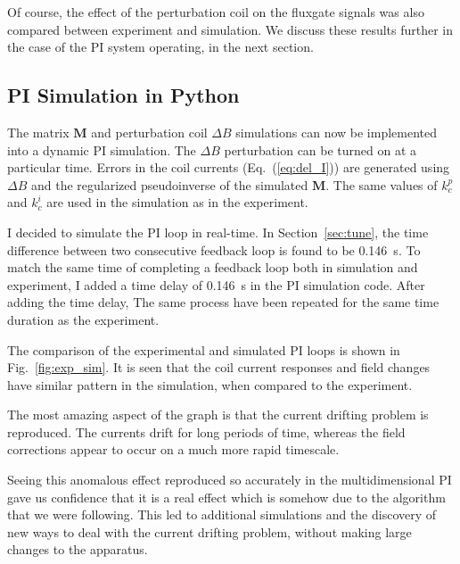 Of course, the effect of the perturbation coil on the fluxgate signals
was also compared between experiment and simulation.  We discuss these
results further in the case of the PI system operating, in the next
section.


\subsection{PI Simulation in Python}

The matrix $\bm{M}$ and perturbation coil $\Delta B$ simulations can
now be implemented into a dynamic PI simulation.  The $\Delta B$
perturbation can be turned on at a particular time.  Errors in the
coil currents (Eq.~(\ref{eq:del_I})) are generated using $\Delta B$
and the regularized pseudoinverse of the simulated $\bm{M}$. The same values
of $k_c^p$ and $k_c^i$ are used in the simulation as in the experiment.

I decided to simulate the PI loop in real-time.  In
Section~\ref{sec:tune}, the time difference between two consecutive
feedback loop is found to be 0.146~s. To match the same time of
completing a feedback loop both in simulation and experiment, I added
a time delay of 0.146~s in the PI simulation code. After adding the
time delay, The same process have been repeated for the same time
duration as the experiment.

The comparison of the experimental and simulated PI loops is shown in
Fig.~\ref{fig:exp_sim}.  It is seen that the coil current responses
and field changes have similar pattern in the simulation, when
compared to the experiment.

The most amazing aspect of the graph is that the current drifting
problem is reproduced.  The currents drift for long periods of time,
whereas the field corrections appear to occur on a much more rapid
timescale.


Seeing this anomalous effect reproduced so accurately in the
multidimensional PI gave us confidence that it is a real effect which
is somehow due to the algorithm that we were following.  This led to
additional simulations and the discovery of new ways to deal with the
current drifting problem, without making large changes to the
apparatus.

